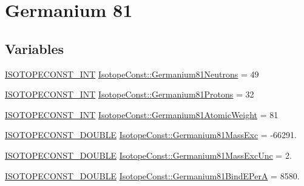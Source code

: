 \hypertarget{group___isotope_const-_germanium-_ge81}{}\section{Germanium 81}
\label{group___isotope_const-_germanium-_ge81}
\subsection*{Variables}
\begin{DoxyCompactItemize}
\item 
\mbox{\hyperlink{group___isotope_const-_macros_ga5f18360b3e99483a35c32d789e62621c}{I\+S\+O\+T\+O\+P\+E\+C\+O\+N\+S\+T\+\_\+\+I\+NT}} \mbox{\hyperlink{group___isotope_const-_germanium-_ge81_ga4e87958e5c25748605aa00e49779ec49}{Isotope\+Const\+::\+Germanium81\+Neutrons}} = 49
\item 
\mbox{\hyperlink{group___isotope_const-_macros_ga5f18360b3e99483a35c32d789e62621c}{I\+S\+O\+T\+O\+P\+E\+C\+O\+N\+S\+T\+\_\+\+I\+NT}} \mbox{\hyperlink{group___isotope_const-_germanium-_ge81_ga8785a8a0f9d925ea90a961aed9555fea}{Isotope\+Const\+::\+Germanium81\+Protons}} = 32
\item 
\mbox{\hyperlink{group___isotope_const-_macros_ga5f18360b3e99483a35c32d789e62621c}{I\+S\+O\+T\+O\+P\+E\+C\+O\+N\+S\+T\+\_\+\+I\+NT}} \mbox{\hyperlink{group___isotope_const-_germanium-_ge81_gaa0fdd2ab19b82302e35730bf6b1b1edf}{Isotope\+Const\+::\+Germanium81\+Atomic\+Weight}} = 81
\item 
\mbox{\hyperlink{group___isotope_const-_macros_ga8f45a7272ce02c0b4c65c44636ed719a}{I\+S\+O\+T\+O\+P\+E\+C\+O\+N\+S\+T\+\_\+\+D\+O\+U\+B\+LE}} \mbox{\hyperlink{group___isotope_const-_germanium-_ge81_ga24e4f29bc553d3df2368b14e869db8a6}{Isotope\+Const\+::\+Germanium81\+Mass\+Exc}} = -\/66291.
\item 
\mbox{\hyperlink{group___isotope_const-_macros_ga8f45a7272ce02c0b4c65c44636ed719a}{I\+S\+O\+T\+O\+P\+E\+C\+O\+N\+S\+T\+\_\+\+D\+O\+U\+B\+LE}} \mbox{\hyperlink{group___isotope_const-_germanium-_ge81_ga71bb294a6b84d32ac69df047b57b1fbf}{Isotope\+Const\+::\+Germanium81\+Mass\+Exc\+Unc}} = 2.
\item 
\mbox{\hyperlink{group___isotope_const-_macros_ga8f45a7272ce02c0b4c65c44636ed719a}{I\+S\+O\+T\+O\+P\+E\+C\+O\+N\+S\+T\+\_\+\+D\+O\+U\+B\+LE}} \mbox{\hyperlink{group___isotope_const-_germanium-_ge81_ga802d30cb5f9780d4b0b7f6a826d27bed}{Isotope\+Const\+::\+Germanium81\+Bind\+E\+PerA}} = 8580.
\item 

\end{DoxyCompactItemize}

